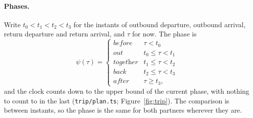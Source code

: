 \documentclass[sigconf,nonacm]{acmart}
\newcommand{\code}[1]{\textnormal{\texttt{\small #1}}}
\begin{document}
\paragraph{Phases.}
Write $t_0<t_1<t_2<t_3$ for the instants of outbound departure, outbound arrival, return
departure and return arrival, and $\tau$ for now. The phase is
\begin{equation}\label{eq:tripphase}
  \psi(\tau) = \begin{cases}
    \textit{before} & \tau < t_0 \\
    \textit{out} & t_0 \le \tau < t_1 \\
    \textit{together} & t_1 \le \tau < t_2 \\
    \textit{back} & t_2 \le \tau < t_3 \\
    \textit{after} & \tau \ge t_3 ,
  \end{cases}
\end{equation}
and the clock counts down to the upper bound of the current phase, with nothing to count to in
the last (\code{trip/plan.ts}; Figure~\ref{fig:trip}). The comparison is between instants, so the phase is the same
for both partners wherever they are.
\end{document}
